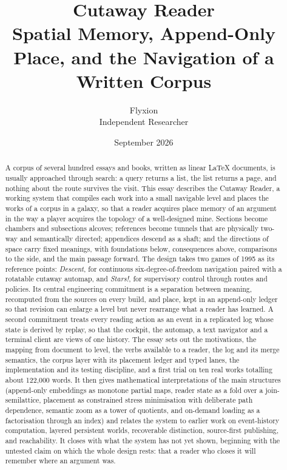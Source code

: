 \documentclass[11pt]{article}
\title{Cutaway Reader\\[0.4em]
\large Spatial Memory, Append-Only Place, and the Navigation of a Written Corpus}
\author{Flyxion\\ \small Independent Researcher}
\date{September 2026}
\theoremstyle{remark}
\begin{document}
\maketitle

\begin{abstract}
A corpus of several hundred essays and books, written as linear LaTeX documents, is usually approached through search: a query returns a list, the list returns a page, and nothing about the route survives the visit. This essay describes the Cutaway Reader, a working system that compiles each work into a small navigable level and places the works of a corpus in a galaxy, so that a reader acquires place memory of an argument in the way a player acquires the topology of a well-designed mine. Sections become chambers and subsections alcoves; references become tunnels that are physically two-way and semantically directed; appendices descend as a shaft; and the directions of space carry fixed meanings, with foundations below, consequences above, comparisons to the side, and the main passage forward. The design takes two games of 1995 as its reference points: \emph{Descent}, for continuous six-degree-of-freedom navigation paired with a rotatable cutaway automap, and \emph{Stars!}, for supervisory control through routes and policies. Its central engineering commitment is a separation between meaning, recomputed from the sources on every build, and place, kept in an append-only ledger so that revision can enlarge a level but never rearrange what a reader has learned. A second commitment treats every reading action as an event in a replicated log whose state is derived by replay, so that the cockpit, the automap, a text navigator and a terminal client are views of one history. The essay sets out the motivations, the mapping from document to level, the verbs available to a reader, the log and its merge semantics, the corpus layer with its placement ledger and typed lanes, the implementation and its testing discipline, and a first trial on ten real works totalling about 122,000 words. It then gives mathematical interpretations of the main structures (append-only embeddings as monotone partial maps, reader state as a fold over a join-semilattice, placement as constrained stress minimisation with deliberate path dependence, semantic zoom as a tower of quotients, and on-demand loading as a factorisation through an index) and relates the system to earlier work on event-history computation, layered persistent worlds, recoverable distinction, source-first publishing, and reachability. It closes with what the system has not yet shown, beginning with the untested claim on which the whole design rests: that a reader who closes it will remember where an argument was.
\end{abstract}
\end{document}
